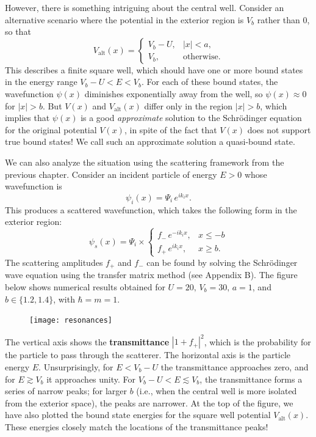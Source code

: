\documentclass[pra,12pt]{revtex4}
\begin{document}
However, there is something intriguing about the central well.
Consider an alternative scenario where the potential in the exterior
region is $V_b$ rather than $0$, so that
\begin{equation}
  V_{\mathrm{alt}}(x) = \begin{cases}V_b - U, & |x| < a, \\ V_b, & \mathrm{otherwise}.\end{cases}
\end{equation}
This describes a finite square well, which should have one or more
bound states in the energy range $V_b-U < E < V_b$.  For each of these
bound states, the wavefunction $\psi(x)$ diminishes exponentially away
from the well, so $\psi(x) \approx 0$ for $|x| > b$.  But $V(x)$ and
$V_{\mathrm{alt}}(x)$ differ only in the region $|x| > b$, which
implies that $\psi(x)$ is a good \textit{approximate} solution to the
Schr\"odinger equation for the original potential $V(x)$, in spite of
the fact that $V(x)$ does not support true bound states!  We call such
an approximate solution a quasi-bound state.

We can also analyze the situation using the scattering framework from
the previous chapter.  Consider an incident particle of energy $E > 0$
whose wavefunction is
\begin{equation}
  \psi_i(x) = \Psi_i \, e^{ik_i x}.
\end{equation}
This produces a scattered wavefunction, which takes the following form
in the exterior region:
\begin{equation}
  \psi_s(x) = \Psi_i \times \begin{cases}f_- \,e^{-ik_ix}, & x \le -b \\ f_+ \,e^{ik_ix}, & x \ge b.\end{cases}
\end{equation}
The scattering amplitudes $f_+$ and $f_-$ can be found by solving the
Schr\"odinger wave equation using the transfer matrix method (see
Appendix B).  The figure below shows numerical results obtained for $U
= 20,\,V_b = 30,\,a=1$, and $b \in \{ 1.2, 1.4\}$, with $\hbar = m =
1$.

\begin{figure}[h]
  \centering\texttt{[image: resonances]}
\end{figure}

\noindent
The vertical axis shows the \textbf{transmittance} $|1+f_+|^2$, which
is the probability for the particle to pass through the scatterer.
The horizontal axis is the particle energy $E$.  Unsurprisingly, for
$E < V_b-U$ the transmittance approaches zero, and for $E \gtrsim V_b$
it approaches unity.  For $V_b-U < E \lesssim V_b$, the transmittance
forms a series of narrow peaks; for larger $b$ (i.e., when the central
well is more isolated from the exterior space), the peaks are
narrower.  At the top of the figure, we have also plotted the bound
state energies for the square well potential $V_{\mathrm{alt}}(x)$.
These energies closely match the locations of the transmittance peaks!
\end{document}

